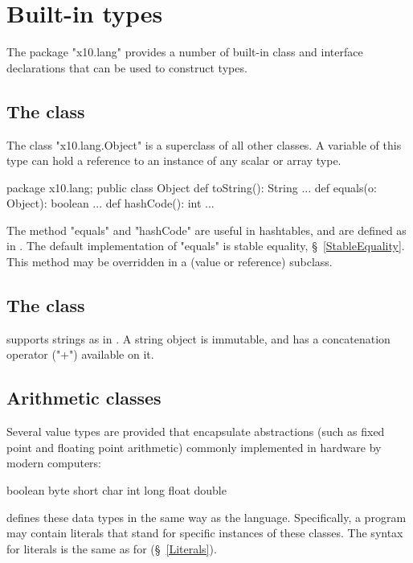 \section{Built-in types}
\cbstart 

The package \xcd"x10.lang" provides a number of built-in class and
interface declarations that can be used to construct types.

\subsection{The class }\label{Object}
The class \xcd"x10.lang.Object" is a superclass of all other classes.
A variable of this type can hold a reference to an instance of any
scalar or array type.

\begin{xten}
package x10.lang;
public class Object {
  def toString(): String {...}
  def equals(o: Object): boolean {...}
  def hashCode(): int {...}
}
\end{xten}

The method \xcd"equals" and \xcd"hashCode" are useful in hashtables,
and are defined as in \java. The default implementation of \xcd"equals"
is stable equality, \S~\ref{StableEquality}. This method may be overridden
in a (value or reference) subclass.

\subsection{The class }
\Xten{} supports strings as in \java{}. A string object is immutable,
and has a concatenation operator (\xcd"+")  available on it.

\subsection{Arithmetic classes}
Several value types are provided that encapsulate
abstractions (such as fixed point and floating point arithmetic)
commonly implemented in hardware by modern computers:

\begin{xten}
boolean
byte short char int long 
float double
\end{xten}

\XtenCurrVer{} defines these data types in the same way as the 
\java{} language. Specifically, a program may contain literals
that stand for specific instances of these classes. The syntax
for literals is the same as for \java{} (\S~\ref{Literals}).

